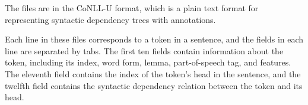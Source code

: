 The files are in the CoNLL-U format, which is a plain text format for representing syntactic dependency trees with annotations.

Each line in these files corresponds to a token in a sentence, and the fields in each line are separated by tabs. The first ten fields contain information about the token, including its index, word form, lemma, part-of-speech tag, and features. The eleventh field contains the index of the token's head in the sentence, and the twelfth field contains the syntactic dependency relation between the token and its head.

